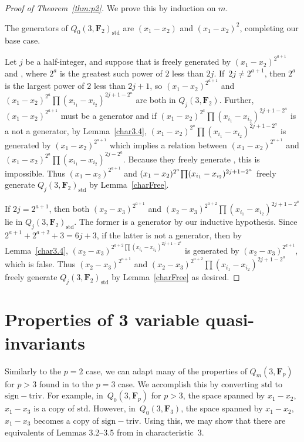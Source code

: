 \documentclass[pdftex]{sigma}
\theoremstyle{definition}
\numberwithin{equation}{section}
\newcommand{\std}{\mathrm{std}}
\newcommand{\siv}{\mathrm{sign-triv}}
\begin{document}
\begin{proof}[Proof of Theorem~\ref{thm:p2}]
 We prove this by induction on $m$.

 The generators of $Q_0(3,\mathbf{F}_2)_{\std}$ are $(x_1-x_2)$ and $(x_1-x_2)^2$, completing our base case.

 Let $j$ be a half-integer, and suppose that \smash{$Q_{j-\frac{1}{2}}(3,\mathbf{F}_2)_\std$} is freely generated by $(x_1-x_2)^{2^{a+1}}$ and ,
 where $2^a$ is the greatest such power of $2$ less than $2j$. If~${2j\neq 2^{a+1}}$, then $2^{a}$ is the largest power of $2$ less than $2j+1$, so $(x_1-x_2)^{2^{a+1}}$ and $(x_1-x_2)^{2^a}\prod (x_{i_1}-x_{i_2})^{2j+1-2^a}$ are both in $Q_j(3,\mathbf{F}_2)$. Further, $(x_1-x_2)^{2^{a+1}}$ must be a generator and if $(x_1-x_2)^{2^a}\prod (x_{i_1}-x_{i_2})^{2j+1-2^a}$ is a not a generator, by Lemma~\ref{char3.4}, $(x_1-x_2)^{2^a}\prod (x_{i_1}-x_{i_2})^{2j+1-2^a}$ is generated by $(x_1-x_2)^{2^{a+1}}$ which implies a relation between $(x_1-x_2)^{2^{a+1}}$ and ${(x_1-x_2)^{2^a}\prod (x_{i_1}-x_{i_2})^{2j-2^a}}$. Because they freely generate , this is impossible. Thus $(x_1-x_2)^{2^{a+1}}$ and $(x_1-x_2)^{2^a}\smash{\prod (x_{i_1}-x_{i_2})^{2j+1-2^a}}$ freely generate $Q_j(3,\mathbf{F}_2)_{\std}$ by Lemma~\ref{charFree}.

 If $2j= 2^{a+1}$, then both $(x_2-x_3)^{2^{a+1}}$ and $(x_2-x_3)^{2^{a+2}}\prod (x_{i_1}-x_{i_2})^{2j+1-2^a}$ lie in $Q_j(3,\mathbf{F}_2)_{\std}$. The former is a generator by our inductive hypothesis.
 Since $2^{a+1}+2^{a+2}+3=6j+3$, if the latter is not a generator, then by Lemma~\ref{char3.4}, $(x_2-x_3)^{2^{a+2}\prod (x_{i_1}-x_{i_2})^{2j+1-2^a}}$ is generated by $(x_2-x_3)^{2^{a+1}}$, which is false. Thus $(x_2-x_3)^{2^{a+1}}$ and $(x_2-x_3)^{2^{a+2}}\prod (x_{i_1}-x_{i_2})^{2j+1-2^a}$ freely generate $Q_j(3,\mathbf{F}_2)_{\std}$ by Lemma~\ref{charFree} as desired.
\end{proof}

\section[Properties of 3 variable quasi-invariants]{Properties of $\boldsymbol{3}$ variable quasi-invariants}\label{sec:wang}
Similarly to the $p=2$ case, we can adapt many of the properties of $Q_m(3,\mathbf{F}_p)$ for $p>3$ found in \cite{wang2022explicit} to the $p=3$ case. We accomplish this by converting $\std$ to $\siv$. For example, in~$Q_0(3,\mathbf{F}_p)$ for $p>3$, the space spanned by $x_1-x_2$, $x_1-x_3$ is a copy of $\std$. However, in~$Q_0(3,\mathbf{F}_3)$, the space spanned by $x_1-x_2$, $x_1-x_3$ becomes a copy of $\siv$. Using this, we may show that there are equivalents of Lemmas 3.2--3.5 from \cite{wang2022explicit} in characteristic~$3$.
\end{document}

